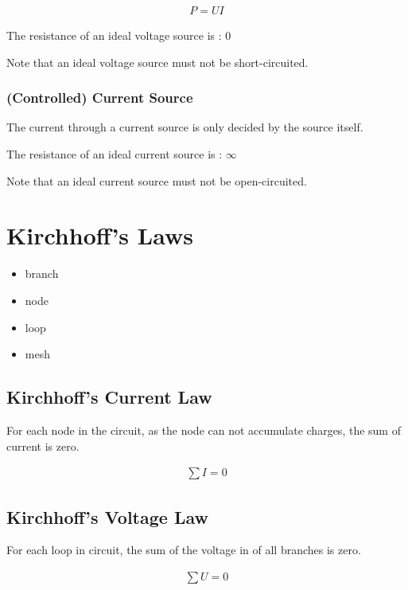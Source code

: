 \begin{equation*}
  \begin{aligned}
    P = U I
  \end{aligned}
\end{equation*}

The resistance of an ideal voltage source is : $0$

Note that an ideal voltage source must not be short-circuited.

\subsubsection{(Controlled) Current Source}

The current through a current source is only decided by the source itself.

The resistance of an ideal current source is : $\infty$

Note that an ideal current source must not be open-circuited.

\section{Kirchhoff's Laws}

\begin{itemize}
\item branch
\item node
\item loop
\item mesh
  
\end{itemize}

\subsection{Kirchhoff's Current Law}

For each node in the circuit, as the node can not accumulate charges, the sum of current is zero.

\begin{equation*}
  \begin{aligned}
    \sum I = 0
  \end{aligned}
\end{equation*}



\subsection{Kirchhoff's Voltage Law}

For each loop in circuit, the sum of the voltage in of all branches is zero.

\begin{equation*}
  \begin{aligned}
    \sum U = 0
  \end{aligned}
\end{equation*}


